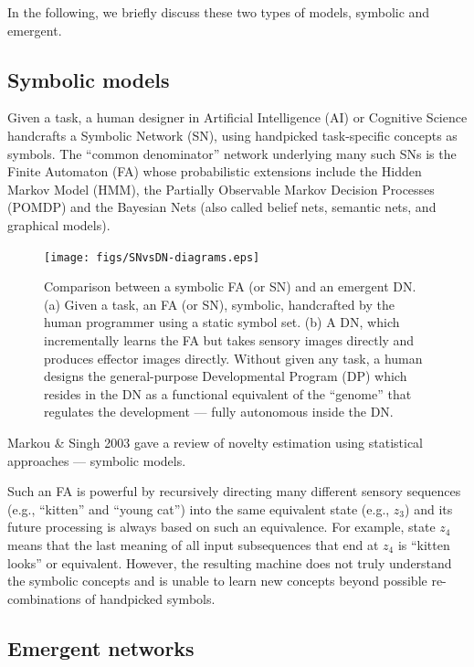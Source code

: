 \documentclass[conference]{IEEEtran}
\begin{document}
In the following, we briefly discuss these two types of models, symbolic and emergent. 

\subsection{Symbolic models}
Given a task, a human designer in Artificial Intelligence (AI) \cite{Soar87,Hawkins09} or Cognitive Science \cite{Anderson93,Tenenbaum06} handcrafts a Symbolic Network (SN), using handpicked task-specific 
concepts as symbols.   The ``common denominator'' network underlying many such SNs is the Finite Automaton (FA) whose probabilistic extensions include  
the Hidden Markov Model (HMM), the Partially Observable Markov Decision Processes (POMDP)
and the Bayesian Nets (also called belief nets, semantic nets, and graphical models).   

\begin{figure}[tb]
     \centering
      \texttt{[image: figs/SNvsDN-diagrams.eps]}
\caption{\protect\small  Comparison between a symbolic FA (or SN) and an emergent DN.
(a) Given a task, an FA (or SN), symbolic, handcrafted by the human programmer using a static symbol set.  
(b)  A DN, which incrementally learns the FA but takes sensory images directly and produces effector images directly.  Without given any task, a human designs the general-purpose Developmental Program (DP) which 
resides in the DN as a functional equivalent of the ``genome'' that regulates the development --- fully autonomous inside the DN.}
 \label{FG:SNvsDN-diagrams}
\end{figure}

Markou \& Singh 2003 \cite{Markou03s} gave a review of novelty estimation using statistical approaches --- symbolic models. 

Such an FA is powerful by recursively directing many different sensory sequences (e.g., ``kitten'' and ``young cat'') into the same equivalent state (e.g., $z_3$) and its future processing is always based on such an equivalence.  For example, state $z_4$  means that the last meaning of all input subsequences that end at 
$z_4$ is ``kitten looks'' or equivalent.   However, the resulting machine does not truly understand the symbolic 
concepts and is unable to learn new concepts beyond possible re-combinations of handpicked symbols.   

\subsection{Emergent networks}
\end{document}
